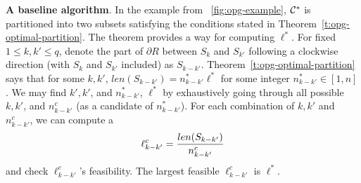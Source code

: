 \noindent\textbf{A baseline algorithm}.
In the example from ~\ref{fig:opg-example}, $\mathcal C^*$ is partitioned into 
two subsets satisfying the conditions stated in 
Theorem~\ref{t:opg-optimal-partition}. The theorem provides a way for 
computing $\ell^*$. For fixed $1 \le k, k' \le q$, denote the part of 
$\partial R$ between $S_k$ and $S_{k'}$ following a clockwise direction 
(with $S_k$ and $S_{k'}$ included) as $S_{k-k'}$.
Theorem~\ref{t:opg-optimal-partition} says that for some $k, k'$, $len(S_{k-k'})
= n_{k-k'}^*\ell^*$ for some integer $n_{k-k'}^* \in [1, n]$. We may 
find $k', k'$, and $n_{k-k'}^*$, $\ell^*$ by exhaustively going through all 
possible $k, k'$, and $n_{k-k'}^c$ (as a candidate of $n_{k-k'}^*$). For 
each combination of $k, k'$ and $n_{k-k'}^c$, we can compute a 
\begin{align}\label{eq:opg-lkkc}
\vspace*{-2mm}
\ell_{k-k'}^c = \frac{len(S_{k-k'})}{n_{k-k'}^c}
\vspace*{-2mm}
\end{align}
and check $\ell_{k-k'}^c$'s feasibility. The largest feasible 
$\ell_{k-k'}^c$ is $\ell^*$. 

